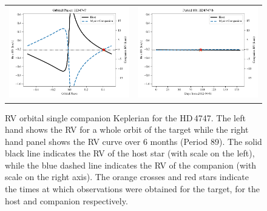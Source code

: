 \begin{figure}
    \centering
    \begin{tabular}{cc}
        \includegraphics[width=0.45\linewidth]{figures/direct-recovery/orbital-plots/HD4747_orbital_phase.pdf}& \includegraphics[width=0.45\linewidth]{figures/direct-recovery/orbital-plots/HD4747_p89.pdf}\\
    \end{tabular}
    \caption{RV orbital single companion Keplerian for the {HD\,4747}. The left hand shows the RV for a whole orbit of the target while the right hand panel shows the RV curve over 6 months (Period 89). The solid black line indicates the RV of the host star (with scale on the left), while the blue dashed line indicates the RV of the companion (with scale on the right axis). The orange crosses and red stars indicate the times at which observations were obtained for the target, for the host and companion respectively.}
    \label{fig:hd4747p89}
\end{figure}

